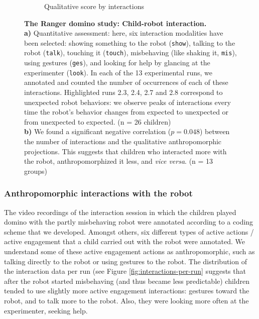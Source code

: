 \documentclass{frontiersSCNS} %
\begin{document}
\begin{figure}
\begin{subfigure}[b]{0.48\columnwidth}
                \caption{Qualitative score by interactions}
                \label{fig:qualitative-score}
        \end{subfigure}
        \caption{\textbf{The Ranger domino study: Child-robot interaction.}\\
    \textbf{a)} Quantitative assessment: here, six interaction modalities have
        been selected: showing something to the robot ({\tt show}), talking to
        the robot ({\tt talk}), touching it ({\tt touch}), misbehaving (like
        shaking it, {\tt mis}), using gestures ({\tt ges}), and looking
        for help by glancing at the experimenter ({\tt look}). In each
        of the 13 experimental runs, we annotated and counted the number of
        occurrences of each of these interactions. Highlighted runs 2.3, 2.4,
        2.7 and 2.8 correspond to unexpected robot behaviors: we observe peaks
        of interactions every time the robot's behavior changes from expected to
        unexpected or from unexpected to expected. (n = 26 children)\\
	\textbf{b)} We found a significant negative correlation ($p=0.048$) between the
    number of interactions and the qualitative anthropomorphic projections. This 
    suggests that children who interacted more with the robot, anthropomorphized it 
	less, and \textit{vice versa}. (n = 13 groups)}
    		\label{fig:Ranger-domino}
\end{figure}


\subsubsection{Anthropomorphic interactions with the robot\\}

The video recordings of the interaction session in which the children 
played domino with the partly misbehaving robot were annotated according 
to a coding scheme that we developed. Amongst others, six different types 
of active actions / active engagement that a child carried out with the 
robot were annotated. We understand some of these active engagement 
actions as anthropomorphic, such as talking directly to the robot or 
using gestures to the robot. The distribution of the interaction data per 
run (see Figure \ref{fig:interactions-per-run} suggests that after the 
robot started misbehaving (and thus became less predictable) children 
tended to use slightly more active engagement interactions: gestures toward the 
robot, and to talk more to the robot. Also, they were looking more often at the 
experimenter, seeking help. 
\end{document}
